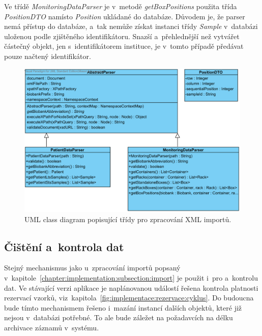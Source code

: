 \documentclass[11pt, final, oneside]{fithesis2}
\begin{document}
Ve třídě \textit{MonitoringDataParser} je v~metodě \textit{getBoxPositions} použita třída \textit{PositionDTO} namísto \textit{Position} ukládané do databáze. Důvodem je, že parser nemá přístup do databáze, a~tak nemůže získat instanci třídy \textit{Sample} v~databázi uloženou podle zjištěného identifikátoru. Snazší a~přehlednější než vytvářet částečný objekt, jen s~identifikátorem instituce, je v~tomto případě předávat pouze načtený identifikátor. 

\begin{figure}[h!]
\centering
	\includegraphics[width=\textwidth]{ParserView}
\caption{UML class diagram popisující třídy pro zpracování XML importů.}
\label{fig:index:uml:class:parser}
\end{figure}

\subsection{Čištění a~kontrola dat}
Stejný mechanismus jako u~zpracování importů popsaný v~kapitole~\ref{chapter:implementation:subsection:import} je použit i~pro  a~kontrolu dat. Ve stávající verzi aplikace je naplánovanou událostí řešena kontrola platnosti rezervací vzorků, viz~kapitola~\ref{fig:implementace:rezervace:cyklus}. 
Do budoucna bude tímto mechanismem řešeno i~mazání instancí dalších objektů, které již nejsou v~databázi potřebné. To ale bude záležet na požadavcích na délku archivace záznamů v~systému.

\end{document}
